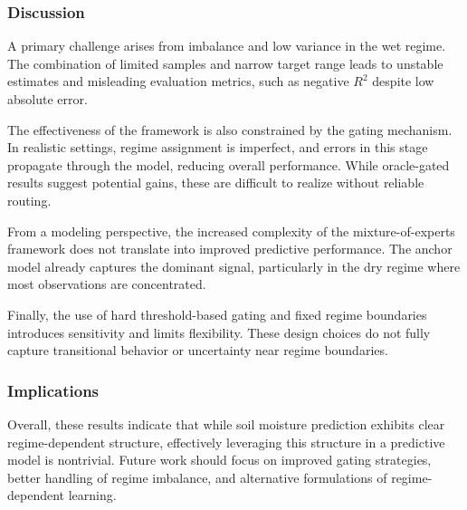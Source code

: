 \subsubsection*{Discussion}

A primary challenge arises from imbalance and low variance in the wet regime. The combination of limited samples and narrow target range leads to unstable estimates and misleading evaluation metrics, such as negative $R^2$ despite low absolute error.

The effectiveness of the framework is also constrained by the gating mechanism. In realistic settings, regime assignment is imperfect, and errors in this stage propagate through the model, reducing overall performance. While oracle-gated results suggest potential gains, these are difficult to realize without reliable routing.

From a modeling perspective, the increased complexity of the mixture-of-experts framework does not translate into improved predictive performance. The anchor model already captures the dominant signal, particularly in the dry regime where most observations are concentrated.

Finally, the use of hard threshold-based gating and fixed regime boundaries introduces sensitivity and limits flexibility. These design choices do not fully capture transitional behavior or uncertainty near regime boundaries.

\subsubsection*{Implications}

Overall, these results indicate that while soil moisture prediction exhibits clear regime-dependent structure, effectively leveraging this structure in a predictive model is nontrivial. Future work should focus on improved gating strategies, better handling of regime imbalance, and alternative formulations of regime-dependent learning.

